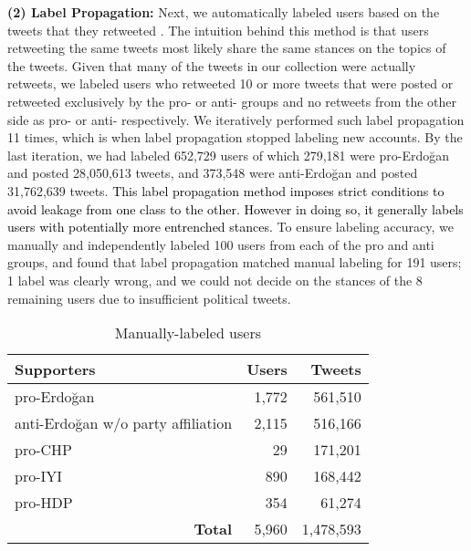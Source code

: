\documentclass[letterpaper]{article} \usepackage{aaai20}  \usepackage{times}  \usepackage{stackengine}
\newcommand{\kareem}{\textcolor{black}}
\begin{document}
\noindent\textbf{(2) Label Propagation:} Next, we automatically labeled users based on the tweets that they retweeted \citep{darwish2017predicting,darwish2018scotus}. The intuition behind this method is that users retweeting the same tweets most likely share the same stances on the topics of the tweets. Given that many of the tweets in our collection were actually retweets, 
we labeled users who retweeted 10 or more tweets that were posted or retweeted exclusively by the pro- or anti- groups and no retweets from the other side as pro- or anti- respectively. We iteratively performed such label propagation 11 times, which is when label propagation stopped labeling new accounts. By the last iteration, we had labeled 652,729 users of which 279,181 were pro-Erdo\u{g}an and posted 28,050,613 tweets, and 373,548 were anti-Erdo\u{g}an and posted 31,762,639 tweets. 
\kareem{This label propagation method imposes strict conditions to avoid leakage from one class to the other.  However in doing so, it generally labels users with potentially more entrenched stances.} 
To ensure labeling accuracy, we manually and independently labeled 100 users from each of the pro and anti groups, and found that label propagation matched manual labeling for 191 users; 1 label was clearly wrong, and we could not decide on the stances of the 8 remaining users due to insufficient political tweets. 




\begin{table}[tbp]
\begin{center}
\begin{tabularx}{\linewidth}{X|r|r}  
\textbf{Supporters} &  \textbf{Users}  & \textbf{Tweets}\\  \hline
pro-Erdo\u{g}an & 1,772 & 561,510\\ \hline
anti-Erdo\u{g}an w/o party affiliation & 2,115 & 516,166\\ \hline
pro-CHP & 29 & 171,201 \\ \hline
pro-IYI & 890 & 168,442\\ \hline
pro-HDP & 354 & 61,274\\ \hline
\multicolumn{1}{r|}{\textbf{Total}} & 5,960 & 1,478,593 \\
\hline
		\end{tabularx}
\end{center}
    \caption{Manually-labeled users}
    \label{tab:proAntiErdogan}
\end{table}
\end{document}
